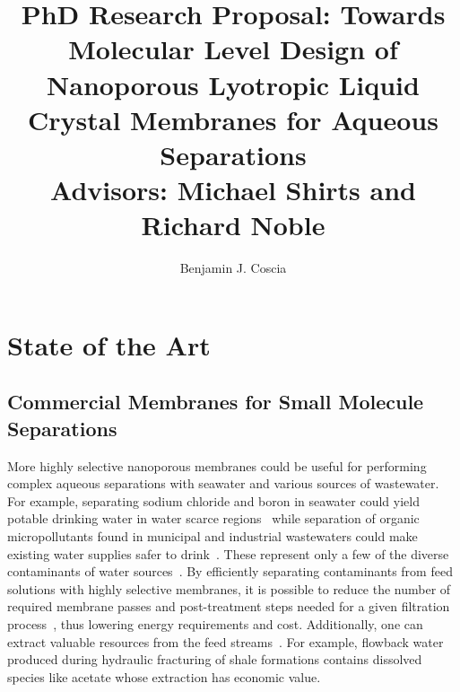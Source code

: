 \documentclass{article}
\title{PhD Research Proposal: Towards Molecular Level Design of Nanoporous Lyotropic Liquid
Crystal Membranes for Aqueous Separations \\ \vspace{0.5cm}
\large Advisors: Michael Shirts and Richard Noble}
\author{Benjamin J. Coscia}
\begin{document}
  \graphicspath{{./figures/}}

  \maketitle
  \thispagestyle{empty}
  \clearpage
  \setcounter{page}{1} %

  \section{State of the Art}\label{section:state-of-the-art}

  \subsection*{Commercial Membranes for Small Molecule Separations}
  
  More highly selective nanoporous membranes could be useful for 
  performing complex aqueous separations with seawater and various
  sources of wastewater. For example, separating sodium chloride and 
  boron in seawater could yield potable drinking water in water scarce
  regions~\cite{fritzmann_state---art_2007} while separation of organic
  micropollutants found in municipal and industrial wastewaters could 
  make existing water supplies safer to drink~\cite{schwarzenbach_challenge_2006}.
  These represent only a few of the diverse contaminants of water sources~\cite{singh_production_2009,liu_removal_2008}. 
  By efficiently separating contaminants from feed solutions with
  highly selective membranes, it is possible to reduce the number of 
  required membrane passes and post-treatment steps needed for a given 
  filtration process~\cite{werber_materials_2016}, thus lowering energy 
  requirements and cost. Additionally, one can extract valuable
  resources from the feed streams~\cite{sales_resource_2015}. For example,
  flowback water produced during hydraulic fracturing of shale 
  formations contains dissolved species like acetate whose extraction has 
  economic value.~\cite{dischinger_application_2017,theodori_hydraulic_2014}
\end{document}
